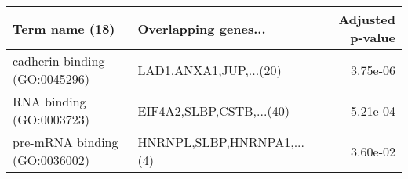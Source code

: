 \begin{tabular}{llr}
\toprule
               Term name (18) &       Overlapping genes... &  Adjusted p-value \\
\midrule
cadherin binding (GO:0045296) &     LAD1,ANXA1,JUP,...(20) &          3.75e-06 \\
     RNA binding (GO:0003723) &   EIF4A2,SLBP,CSTB,...(40) &          5.21e-04 \\
pre-mRNA binding (GO:0036002) & HNRNPL,SLBP,HNRNPA1,...(4) &          3.60e-02 \\
\bottomrule
\end{tabular}
